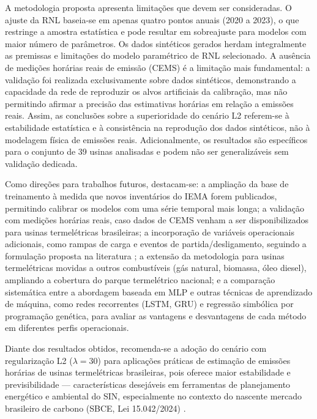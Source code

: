 A metodologia proposta apresenta limitações que devem ser consideradas. O ajuste da \ac{RNL} baseia-se em apenas quatro pontos anuais (2020 a 2023), o que restringe a amostra estatística e pode resultar em sobreajuste para modelos com maior número de parâmetros. Os dados sintéticos gerados herdam integralmente as premissas e limitações do modelo paramétrico de \ac{RNL} selecionado. A ausência de medições horárias reais de emissão (\ac{CEMS}) é a limitação mais fundamental: a validação foi realizada exclusivamente sobre dados sintéticos, demonstrando a capacidade da rede de reproduzir os alvos artificiais da calibração, mas não permitindo afirmar a precisão das estimativas horárias em relação a emissões reais. Assim, as conclusões sobre a superioridade do cenário L2 referem-se à estabilidade estatística e à consistência na reprodução dos dados sintéticos, não à modelagem física de emissões reais. Adicionalmente, os resultados são específicos para o conjunto de 39 usinas analisadas e podem não ser generalizáveis sem validação dedicada.

Como direções para trabalhos futuros, destacam-se: a ampliação da base de treinamento à medida que novos inventários do \ac{IEMA} forem publicados, permitindo calibrar os modelos com uma série temporal mais longa; a validação com medições horárias reais, caso dados de \ac{CEMS} venham a ser disponibilizados para usinas termelétricas brasileiras; a incorporação de variáveis operacionais adicionais, como rampas de carga e eventos de partida/desligamento, seguindo a formulação proposta na literatura \cite{carrion2006computationally}; a extensão da metodologia para usinas termelétricas movidas a outros combustíveis (gás natural, biomassa, óleo diesel), ampliando a cobertura do parque termelétrico nacional; e a comparação sistemática entre a abordagem baseada em \ac{MLP} e outras técnicas de aprendizado de máquina, como redes recorrentes (\ac{LSTM}, \ac{GRU}) e regressão simbólica por programação genética, para avaliar as vantagens e desvantagens de cada método em diferentes perfis operacionais.

Diante dos resultados obtidos, recomenda-se a adoção do cenário com regularização L2 (\(\lambda = 30\)) para aplicações práticas de estimação de emissões horárias de usinas termelétricas brasileiras, pois oferece maior estabilidade e previsibilidade — características desejáveis em ferramentas de planejamento energético e ambiental do \ac{SIN}, especialmente no contexto do nascente mercado brasileiro de carbono (\ac{SBCE}, Lei 15.042/2024) \cite{brasil_sbce}.